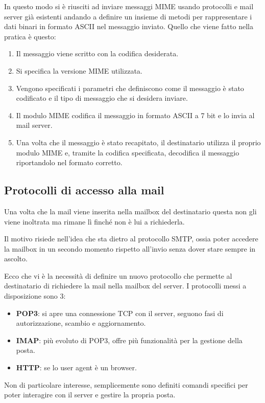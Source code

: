 In questo modo si è riusciti ad inviare messaggi MIME usando protocolli e mail server già
esistenti andando a definire un insieme di metodi per rappresentare i dati binari in formato ASCII
nel messaggio inviato. Quello che viene fatto nella pratica è questo:
\begin{enumerate}
	\item Il messaggio viene scritto con la codifica desiderata.
	\item Si specifica la versione MIME utilizzata.
	\item Vengono specificati i parametri che definiscono come il messaggio è stato codificato e
		il tipo di messaggio che si desidera inviare.
	\item Il modulo MIME codifica il messaggio in formato ASCII a 7 bit e lo invia al mail server.
	\item Una volta che il messaggio è stato recapitato, il destinatario utilizza il proprio modulo
		MIME e, tramite la codifica specificata, decodifica il messaggio riportandolo nel formato
		corretto.
\end{enumerate}

\subsection{Protocolli di accesso alla mail}
Una volta che la mail viene inserita nella mailbox del destinatario questa non gli viene inoltrata
ma rimane lì finché non è lui a richiederla.

Il motivo risiede nell'idea che sta dietro al protocollo SMTP, ossia poter accedere la mailbox in
un secondo momento rispetto all'invio senza dover stare sempre in ascolto.

Ecco che vi è la necessità di definire un nuovo protocollo che permette al destinatario di
richiedere la mail nella mailbox del server. I protocolli messi a disposizione sono 3:
\begin{itemize}
	\item \textbf{POP3}: si apre una connessione TCP con il server, seguono fasi di autorizzazione,
		scambio e aggiornamento.
	\item \textbf{IMAP}: più evoluto di POP3, offre più funzionalità per la gestione della posta.
	\item \textbf{HTTP}: se lo user agent è un browser.
\end{itemize}
Non di particolare interesse, semplicemente sono definiti comandi specifici per poter interagire
con il server e gestire la propria posta.
